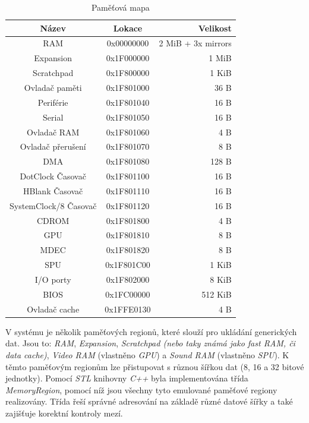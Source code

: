 \begin{table}[htbp]
    \caption{Paměťová mapa}
    \begin{center}
    \begin{tabular}{ |c|c|r| }
    \hline
    \textbf{Název} & \textbf{Lokace} & \textbf{Velikost} \\
    \hline
    RAM & 0x00000000 & 2 MiB + 3x mirrors \\
    Expansion & 0x1F000000 & 1 MiB \\
    Scratchpad & 0x1F800000 & 1 KiB \\
    Ovladač paměti & 0x1F801000 & 36 B \\
    Periférie & 0x1F801040 & 16 B \\
    Serial & 0x1F801050 & 16 B \\
    Ovladač RAM & 0x1F801060 & 4 B \\
    Ovladač přerušení & 0x1F801070 & 8 B \\
    DMA & 0x1F801080 & 128 B \\
    DotClock Časovač & 0x1F801100 & 16 B \\
    HBlank Časovač & 0x1F801110 & 16 B \\
    SystemClock/8 Časovač & 0x1F801120 & 16 B \\
    CDROM & 0x1F801800 & 4 B \\
    GPU & 0x1F801810 & 8 B \\
    MDEC & 0x1F801820 & 8 B \\
    SPU & 0x1F801C00 & 1 KiB \\
    I/O porty & 0x1F802000 & 8 KiB \\
    BIOS & 0x1FC00000 & 512 KiB \\
    Ovladač cache & 0x1FFE0130 & 4 B \\
    \hline
    \end{tabular}
    \end{center}
    \label{memory-map}
\end{table}

V systému je několik paměťových regionů, které slouží pro ukládání generických dat. Jsou to: \textit{RAM}, \textit{Expansion}, \textit{Scratchpad (nebo taky známá jako fast RAM, či data cache)}, \textit{Video RAM} (vlastněno \textit{GPU}) a \textit{Sound RAM} (vlastněno \textit{SPU}). K těmto paměťovým regionům lze přistupovat s různou šířkou dat (8, 16 a 32 bitové jednotky). Pomocí \textit{STL} knihovny \textit{C++} byla implementována třída \textit{MemoryRegion}, pomocí níž jsou všechny tyto emulované paměťové regiony realizovány. Třída řeší správné adresování na základě různé datové šířky a také zajišťuje korektní kontroly mezí.

